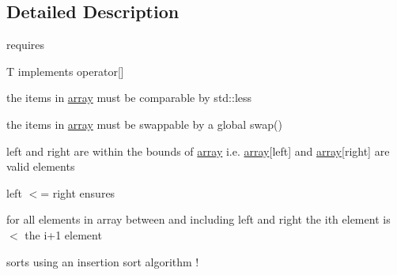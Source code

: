 \subsection{Detailed Description}
requires
\begin{DoxyItemize}
\item T implements operator\mbox{[}\mbox{]}
\item the items in \hyperlink{classdlib_1_1array}{array} must be comparable by std::less
\item the items in \hyperlink{classdlib_1_1array}{array} must be swappable by a global swap()
\item left and right are within the bounds of \hyperlink{classdlib_1_1array}{array} i.e. \hyperlink{classdlib_1_1array}{array}\mbox{[}left\mbox{]} and \hyperlink{classdlib_1_1array}{array}\mbox{[}right\mbox{]} are valid elements
\item left $<$= right ensures
\item for all elements in array between and including left and right the ith element is $<$ the i+1 element
\item sorts using an insertion sort algorithm ! 
\end{DoxyItemize}


